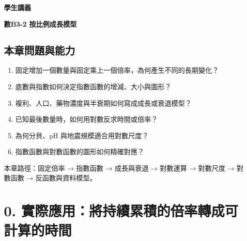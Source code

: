 \documentclass[11pt,a4paper]{article}
\providecommand{\tightlist}{%
  \setlength{\itemsep}{0pt}\setlength{\parskip}{0pt}}
\begin{document}
\begin{tcolorbox}[
  enhanced,colback=white,colframe=HandoutBlue,boxrule=1.1pt,arc=2mm,
  borderline west={3pt}{0pt}{HandoutBlue},left=5mm,right=4mm,top=4mm,bottom=4mm
]
{\sffamily\small\bfseries\color{HandoutBlue}學生講義}\par
{\sffamily\bfseries\LARGE\color{HandoutInk}數B3-2 按比例成長模型}\par
\vspace{0.35em}{\large 用指數描述固定倍率的累積，再用對數反求時間、倍率與尺度}\par
{}\par
{}\par
\end{tcolorbox}


\begin{HandoutLearningMap}

\subsection{本章問題與能力}\label{ux672cux7ae0ux554fux984cux8207ux80fdux529b}

\begin{enumerate}
\def\labelenumi{\arabic{enumi}.}
\tightlist
\item
  固定增加一個數量與固定乘上一個倍率，為何產生不同的長期變化？
\item
  底數與指數如何決定指數函數的增減、大小與圖形？
\item
  複利、人口、藥物濃度與半衰期如何寫成成長或衰退模型？
\item
  已知最後數量時，如何用對數反求時間或倍率？
\item
  為何分貝、pH 與地震規模適合用對數尺度？
\item
  指數函數與對數函數的圖形如何精確對應？
\end{enumerate}

本章路徑：固定倍率 → 指數函數 → 成長與衰退 → 對數運算 → 對數尺度 → 對數函數 → 反函數與資料模型。

\end{HandoutLearningMap}

\section{0. 實際應用：將持續累積的倍率轉成可計算的時間}\label{ux5be6ux969bux61c9ux7528ux5c07ux6301ux7e8cux7d2fux7a4dux7684ux500dux7387ux8f49ux6210ux53efux8a08ux7b97ux7684ux6642ux9593}
\end{document}
